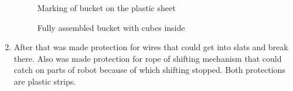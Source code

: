 \begin{enumerate}
 \begin{figure}[H]
  \begin{minipage}[h]{0.49\linewidth}
  	\caption{Marking of bucket on the plastic sheet}
  \end{minipage} 
  \begin{minipage}[h]{0.49\linewidth}
  	\caption{Fully assembled bucket with cubes inside} 
  \end{minipage}
 \end{figure}
  
  \item After that was made protection for wires that could get into slats and break there. Also was made protection for rope of shifting mechanism that could catch on parts of robot because of which shifting stopped. Both protections are plastic strips.
  

\end{enumerate}
